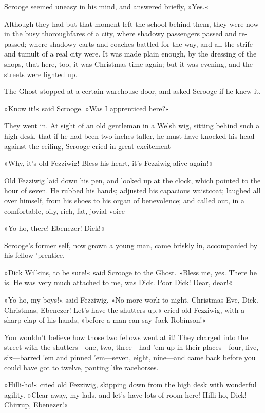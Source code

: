 Scrooge seemed uneasy in his mind, and answered briefly, »Yes.«

Although they had but that moment left the school behind them, they were now in the busy thoroughfares of a city, where shadowy passengers passed and re-passed; where shadowy carts and coaches battled for the way, and all the strife and tumult of a real city were. It was made plain enough, by the dressing of the shops, that here, too, it was Christmas-time again; but it was evening, and the streets were lighted up.

The Ghost stopped at a certain warehouse door, and asked Scrooge if he knew it.

»Know it!« said Scrooge. »Was I apprenticed here?«

They went in. At sight of an old gentleman in a Welsh wig, sitting behind such a high desk, that if he had been two inches taller, he must have knocked his head against the ceiling, Scrooge cried in great excitement--- 

»Why, it's old Fezziwig! Bless his heart, it's Fezziwig alive again!«

Old Fezziwig laid down his pen, and looked up at the clock, which pointed to the hour of seven. He rubbed his hands; adjusted his capacious waistcoat; laughed all over himself, from his shoes to his organ of benevolence; and called out, in a comfortable, oily, rich, fat, jovial voice--- 

»Yo ho, there! Ebenezer! Dick!«

Scrooge's former self, now grown a young man, came briskly in, accompanied by his fellow-'prentice.

»Dick Wilkins, to be sure!« said Scrooge to the Ghost. »Bless me, yes. There he is. He was very much attached to me, was Dick. Poor Dick! Dear, dear!«

»Yo ho, my boys!« said Fezziwig. »No more work to-night. Christmas Eve, Dick. Christmas, Ebenezer! Let's have the shutters up,« cried old Fezziwig, with a sharp clap of his hands, »before a man can say Jack Robinson!«

You wouldn't believe how those two fellows went at it! They charged into the street with the shutters---one, two, three---had 'em up in their places---four, five, six---barred 'em and pinned 'em---seven, eight, nine---and came back before you could have got to twelve, panting like racehorses.

»Hilli-ho!« cried old Fezziwig, skipping down from the high desk with wonderful agility. »Clear away, my lads, and let's have lots of room here! Hilli-ho, Dick! Chirrup, Ebenezer!«

